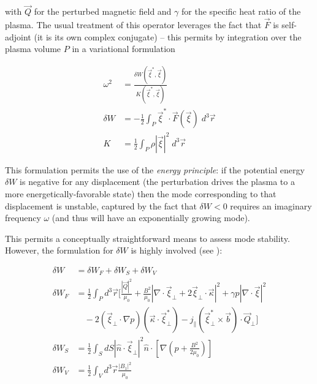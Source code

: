 \noindent with $\vec{Q}$ for the perturbed magnetic field and $\gamma$ for the specific heat ratio of the plasma.  The usual treatment of this operator leverages the fact that $\vec{F}$ is self-adjoint (\ie it is its own complex conjugate) -- this permits by integration over the plasma volume $P$ in a variational formulation

\begin{equation}\label{eq:energyprinciple}
 \begin{aligned}
  \omega^2 &= \frac{\delta W \left( \vec{\xi}^*,\vec{\xi} \right)}{K\left(\vec{\xi}^*,\vec{\xi} \right)}\\
  \delta W &= -\frac{1}{2} \int_P \vec{\xi}^* \cdot \vec{F} \left( \vec{\xi} \right) \;d^3 \vec{r}\\
  K &= \frac{1}{2} \int_P \rho \left| \vec{\xi} \right|^2 \;d^3 \vec{r}
 \end{aligned}
\end{equation}

\noindent This formulation permits the use of the \emph{energy principle}: if the potential energy $\delta W$ is negative for any displacement (\ie the perturbation drives the plasma to a more energetically-favorable state) then the mode corresponding to that displacement is unstable, captured by the fact that $\delta W < 0$ requires an imaginary frequency $\omega$ (and thus will have an exponentially growing mode).  

This permits a conceptually straightforward means to assess mode stability.  However, the formulation for $\delta W$ is highly involved (see \cite[\S 8.8]{Freidberg1987}):

\begin{equation}\label{eq:deltaW}
 \begin{aligned}
  \delta W &= \delta W_F + \delta W_S + \delta W_V\\
  \delta W_F &= \frac{1}{2} \int_P d^3 \vec{r} \Bigg[ \frac{|\vec{Q}|^2}{\mu_0} + \frac{B^2}{\mu_0} \left| \nabla \cdot \vec{\xi}_\perp + 2 \vec{\xi}_\perp \cdot \vec{\kappa} \right|^2 + \gamma p \left| \nabla \cdot \vec{\xi} \right|^2\\
  &\quad- 2\left( \vec{\xi}_\perp \cdot \nabla p \right) \left(\vec{\kappa} \cdot \vec{\xi}_\perp^* \right) - j_\parallel \left(\vec{\xi}_\perp^* \times \vec{b} \right) \cdot \vec{Q}_\perp \Bigg]\\
  \delta W_S &= \frac{1}{2} \int_S dS \left| \hat{n} \cdot \vec{\xi}_\perp \right|^2 \hat{n} \cdot \left[ \nabla \left( p + \frac{B^2}{2\mu_0} \right) \right]\\
  \delta W_V &= \frac{1}{2} \int_V d^3 \vec{r} \frac{\left|B_1 \right|^2}{\mu_0}
 \end{aligned}
\end{equation}

